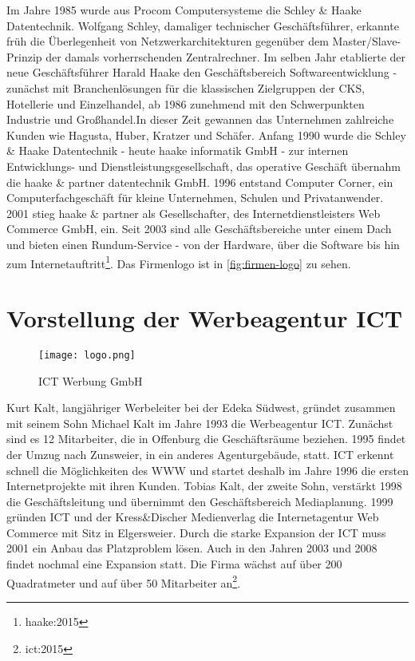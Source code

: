Im Jahre 1985 wurde aus Procom Computersysteme die Schley \& Haake Datentechnik. Wolfgang Schley, damaliger technischer Geschäftsführer, erkannte früh die Überlegenheit von  Netzwerkarchitekturen gegenüber dem Master/Slave-Prinzip der damals vorherrschenden Zentralrechner. Im selben Jahr etablierte der neue Geschäftsführer Harald Haake den Geschäftsbereich Softwareentwicklung - zunächst mit Branchenlösungen für die klassischen Zielgruppen der CKS, Hotellerie und Einzelhandel, ab 1986 zunehmend mit den Schwerpunkten Industrie und Großhandel.In dieser Zeit gewannen das Unternehmen zahlreiche Kunden wie Hagusta, Huber, Kratzer und Schäfer. Anfang 1990 wurde die Schley \& Haake Datentechnik - heute haake informatik GmbH - zur internen Entwicklungs- und Dienstleistungsgesellschaft, das operative Geschäft übernahm die haake \& partner datentechnik GmbH. 1996 entstand Computer Corner, ein Computerfachgeschäft für kleine Unternehmen, Schulen und Privatanwender. 2001  stieg haake \& partner als Gesellschafter, des Internetdienstleisters Web Commerce GmbH, ein. Seit 2003 sind alle Geschäftsbereiche unter einem Dach und bieten einen Rundum-Service - von der Hardware, über die Software bis hin zum Internetauftritt\footnote{haake:2015}. 
Das Firmenlogo ist in \autoref{fig:firmen-logo} zu sehen.

\section{Vorstellung der Werbeagentur ICT}

\begin{wrapfigure}{r}{.4\textwidth}
\centering \texttt{[image: logo.png]}
\vspace{-15pt}
\caption{ICT Werbung GmbH\footnotemark}
\end{wrapfigure}

Kurt Kalt, langjähriger Werbeleiter bei der Edeka Südwest, gründet zusammen mit seinem Sohn Michael Kalt im Jahre 1993 die Werbeagentur ICT. Zunächst sind es 12 Mitarbeiter, die in Offenburg die Geschäftsräume beziehen. 1995 findet der Umzug nach Zunsweier, in ein anderes Agenturgebäude, statt. ICT erkennt schnell die Möglichkeiten des {WWW} und startet deshalb im Jahre 1996 die ersten Internetprojekte mit ihren Kunden. Tobias Kalt, der zweite Sohn, verstärkt 1998 die Geschäftsleitung und übernimmt den Geschäftsbereich Mediaplanung. 1999 gründen ICT und der Kress\&Discher Medienverlag die Internetagentur Web Commerce mit Sitz in Elgersweier. Durch die starke Expansion der ICT muss 2001 ein Anbau das Platzproblem lösen. Auch in den Jahren 2003 und 2008 findet nochmal eine Expansion statt. Die Firma wächst auf über 200 Quadratmeter und auf über 50 Mitarbeiter an\footnote{ict:2015}. 

